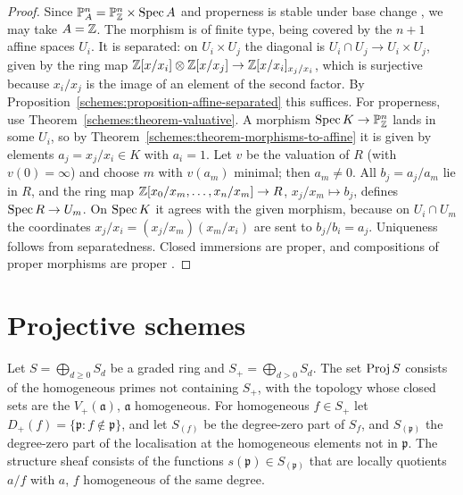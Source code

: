 \begin{proof}
Since $\mathbb{P}^n_A = \mathbb{P}^n_{\mathbb{Z}} \times \operatorname{Spec} A$ and properness is stable under base change \cite[Corollary II.4.8]{hartshorne-ag}, we may take $A = \mathbb{Z}$. The
morphism is of finite type, being covered by the $n + 1$ affine spaces $U_i$. It is separated: on $U_i \times U_j$ the diagonal is
$U_i \cap U_j \to U_i \times U_j$, given by the ring map $\mathbb{Z}[x/x_i] \otimes \mathbb{Z}[x/x_j] \to \mathbb{Z}[x/x_i]_{x_j/x_i}$, which is surjective because $x_i/x_j$ is the
image of an element of the second factor. By Proposition~\ref{schemes:proposition-affine-separated} this suffices. For properness, use
Theorem~\ref{schemes:theorem-valuative}. A morphism $\operatorname{Spec} K \to \mathbb{P}^n_{\mathbb{Z}}$ lands in some $U_i$, so by
Theorem~\ref{schemes:theorem-morphisms-to-affine} it is given by elements $a_j = x_j/x_i \in K$ with $a_i = 1$. Let $v$ be the valuation of $R$
(with $v(0) = \infty$) and choose $m$ with $v(a_m)$ minimal; then $a_m \neq 0$. All $b_j = a_j/a_m$ lie in $R$, and the ring map
$\mathbb{Z}[x_0/x_m, \ldots, x_n/x_m] \to R$, $x_j/x_m \mapsto b_j$, defines $\operatorname{Spec} R \to U_m$. On $\operatorname{Spec} K$ it agrees with the given morphism, because on
$U_i \cap U_m$ the coordinates $x_j/x_i = (x_j/x_m)(x_m/x_i)$ are sent to $b_j/b_i = a_j$. Uniqueness follows from separatedness. Closed immersions are proper, and compositions of proper morphisms are proper \cite[Corollary II.4.8]{hartshorne-ag}.
\end{proof}

\section{Projective schemes}\label{schemes:section-proj}

\begin{definition}\label{schemes:definition-proj}
Let $S = \bigoplus_{d \geq 0}S_d$ be a graded ring and $S_+ = \bigoplus_{d > 0}S_d$. The set $\operatorname{Proj} S$ consists of the homogeneous primes not containing
$S_+$, with the topology whose closed sets are the $V_+(\mathfrak{a})$, $\mathfrak{a}$ homogeneous. For homogeneous $f \in S_+$ let
$D_+(f) = \{\mathfrak{p} : f \notin \mathfrak{p}\}$, and let $S_{(f)}$ be the degree-zero part of $S_f$, and $S_{(\mathfrak{p})}$ the degree-zero part of the
localisation at the homogeneous elements not in $\mathfrak{p}$. The structure sheaf consists of the functions $s(\mathfrak{p}) \in S_{(\mathfrak{p})}$ that are
locally quotients $a/f$ with $a$, $f$ homogeneous of the same degree.
\end{definition}

